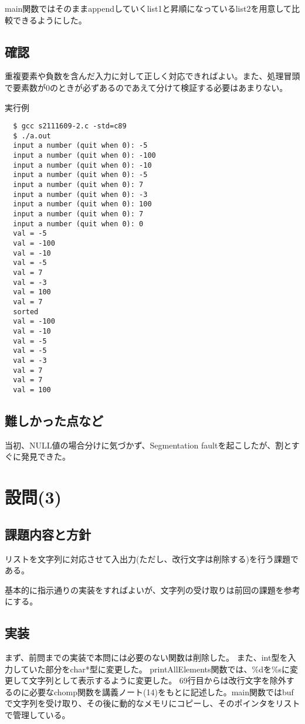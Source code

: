 \documentclass[dvipdfmx,12pt,a4j]{jarticle}
\begin{document}
main関数ではそのままappendしていくlist1と昇順になっているlist2を用意して比較できるようにした。




\subsection{確認}
重複要素や負数を含んだ入力に対して正しく対応できればよい。また、処理冒頭で要素数が0のときが必ずあるのであえて分けて検証する必要はあまりない。

\begin{itembox}[l]{実行例}
\begin{verbatim}
  $ gcc s2111609-2.c -std=c89
  $ ./a.out
  input a number (quit when 0): -5
  input a number (quit when 0): -100
  input a number (quit when 0): -10
  input a number (quit when 0): -5
  input a number (quit when 0): 7
  input a number (quit when 0): -3
  input a number (quit when 0): 100
  input a number (quit when 0): 7
  input a number (quit when 0): 0
  val = -5
  val = -100
  val = -10
  val = -5
  val = 7
  val = -3
  val = 100
  val = 7
  sorted
  val = -100
  val = -10
  val = -5
  val = -5
  val = -3
  val = 7
  val = 7
  val = 100
\end{verbatim}
\end{itembox}

\subsection{難しかった点など}
当初、NULL値の場合分けに気づかず、Segmentation faultを起こしたが、割とすぐに発見できた。


\section{設問(3)}
\subsection{課題内容と方針}
リストを文字列に対応させて入出力(ただし、改行文字は削除する)を行う課題である。

基本的に指示通りの実装をすればよいが、文字列の受け取りは前回の課題を参考にする。

\subsection{実装}
まず、前問までの実装で本問には必要のない関数は削除した。
また、int型を入力していた部分をchar*型に変更した。
printAllElements関数では、\%dを\%sに変更して文字列として表示するように変更した。
69行目からは改行文字を除外するのに必要なchomp関数を講義ノート(14)をもとに記述した。main関数ではbufで文字列を受け取り、その後に動的なメモリにコピーし、そのポインタをリストで管理している。

\end{document}

